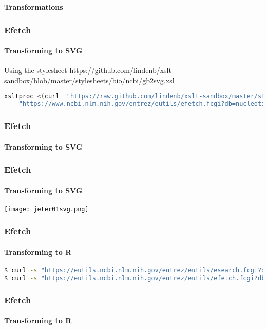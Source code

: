\documentclass{beamer}
\newcommand{\centeredtitle}[1]{
\begin{center}
    \Huge{\bf{#1}}
\end{center}
}
\newcommand{\hugeslide}[1]{
\begin{frame}
\centeredtitle{#1}
\end{frame}
}
\begin{document}
\hugeslide{Transformations}

\begin{frame}[fragile]
\frametitle{Efetch}
\framesubtitle{Transforming to SVG}

Using the stylesheet \url{https://github.com/lindenb/xslt-sandbox/blob/master/stylesheets/bio/ncbi/gb2svg.xsl}

\begin{lstlisting}[language=bash,basicstyle=\tiny,breaklines=true,escapechar=\!]
xsltproc <(curl  "https://raw.github.com/lindenb/xslt-sandbox/master/stylesheets/bio/ncbi/gb2svg.xsl") \
	"https://www.ncbi.nlm.nih.gov/entrez/eutils/efetch.fcgi?db=nucleotide&id=14971102&retmode=xml&rettype=gbc"
\end{lstlisting}
\end{frame}

\begin{frame}[fragile]
\frametitle{Efetch}
\framesubtitle{Transforming to SVG}

\end{frame}

\begin{frame}[fragile]
\frametitle{Efetch}
\framesubtitle{Transforming to SVG}
\begin{center}
\texttt{[image: jeter01svg.png]}
\end{center}
\end{frame}


\begin{frame}[fragile]
\frametitle{Efetch}
\framesubtitle{Transforming to R}
\begin{lstlisting}[language=bash,basicstyle=\tiny,breaklines=true,escapechar=\!]
$ curl -s "https://eutils.ncbi.nlm.nih.gov/entrez/eutils/esearch.fcgi?db=pubmed&term=Tyrannosaurus&usehistory=true" | xmllint --format -
$ curl -s "https://eutils.ncbi.nlm.nih.gov/entrez/eutils/efetch.fcgi?db=pubmed&usehistory=true&WebEnv=NCID_1_52434791_130.14.22.215_9001_1375957034_1619786167&query_key=1&retmode=xml"
\end{lstlisting}
\end{frame}


\begin{frame}[fragile]
\frametitle{Efetch}
\framesubtitle{Transforming to R}

\end{frame}
\end{document}
